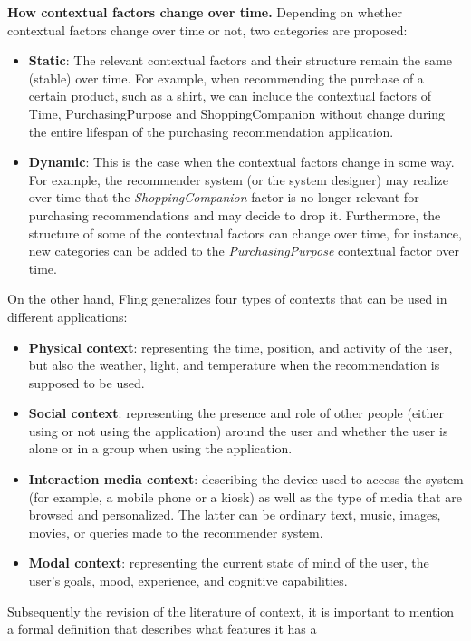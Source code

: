 \textbf{How contextual factors change over time.} Depending on whether 
contextual factors change over time or not, two categories are proposed: 
	\begin{itemize}
	\item \textbf{Static}: The relevant contextual factors and their structure
	remain the same (stable) over time. For example, when recommending the
	purchase of a certain product, such as a shirt, we can include the
	contextual factors of Time, PurchasingPurpose and ShoppingCompanion 
	without change during the entire lifespan of the purchasing recommendation
	application.
	\item \textbf {Dynamic}: This is the case when the contextual factors 
	change in some way. For example, the recommender system (or the 
	system designer) may realize over time that the \textit{ShoppingCompanion} 
	factor is no longer relevant for purchasing recommendations and may 
	decide to drop it. Furthermore, the structure of some of the contextual
	factors can change over time, for instance, new categories can be
	added to the \textit{PurchasingPurpose} contextual factor over time.
	\end{itemize}
On the other hand, Fling  \cite{fling2009mobile} generalizes four types of
contexts that can be used in different applications:  
\begin{itemize}  
\item \textbf{Physical context}: representing the time, position, and
activity of the user, but also the weather, light, and temperature
when the recommendation is supposed to be used.  
\item \textbf{Social context}: representing the presence and role 
of other people (either using or not using the application) around 
the user and whether the user is alone or in a group when using 
the application. 
\item \textbf{Interaction media context}: describing the device used to
access the system (for example, a mobile phone or a kiosk) as well as
the type of media that are browsed and personalized. The latter can be
ordinary text, music, images, movies, or queries made to the
recommender system.  
\item \textbf{Modal context}: representing the current state 
of mind of the user,  the user's goals, mood, experience, 
and cognitive capabilities. 
\end{itemize} 
Subsequently the revision of the literature of context, it is important
to mention a formal definition that describes what features it has a
